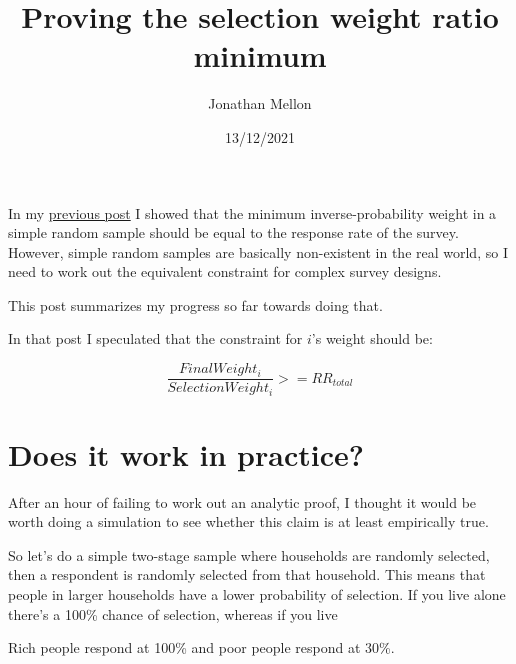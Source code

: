 \documentclass[
]{article}
\title{Proving the selection weight ratio minimum}
\author{Jonathan Mellon}
\date{13/12/2021}
\begin{document}
\maketitle

In my
\href{https://www.filedrawer.blog/post/minimum-post-strat-weight-is-response-rate/}{previous
post} I showed that the minimum inverse-probability weight in a simple
random sample should be equal to the response rate of the survey.
However, simple random samples are basically non-existent in the real
world, so I need to work out the equivalent constraint for complex
survey designs.

This post summarizes my progress so far towards doing that.

In that post I speculated that the constraint for \(i\)'s weight should
be:

\[
\frac{FinalWeight_i}{SelectionWeight_i} >= RR_{total}
\]

\hypertarget{does-it-work-in-practice}{%
\section{Does it work in practice?}\label{does-it-work-in-practice}}

After an hour of failing to work out an analytic proof, I thought it
would be worth doing a simulation to see whether this claim is at least
empirically true.

So let's do a simple two-stage sample where households are randomly
selected, then a respondent is randomly selected from that household.
This means that people in larger households have a lower probability of
selection. If you live alone there's a 100\% chance of selection,
whereas if you live

Rich people respond at 100\% and poor people respond at 30\%.
\end{document}
